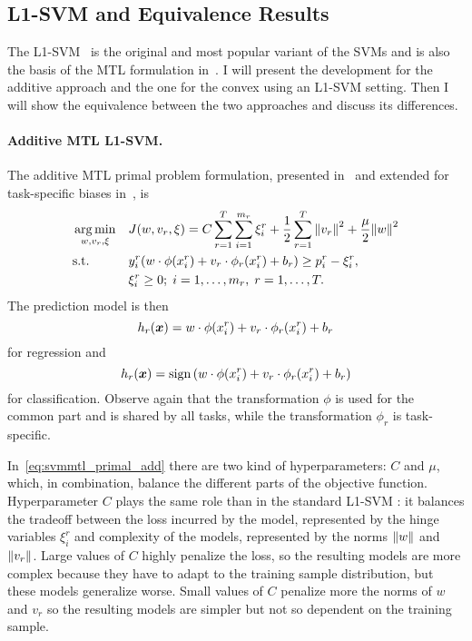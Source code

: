\subsection{L1-SVM and Equivalence Results}\label{subsec:cvx_l1-svm}
The L1-SVM~\citet{Vapnik00} is the original and most popular variant of the SVMs and is also the basis of the MTL formulation in~\cite{EvgeniouP04}.
I will present the development for the {additive} approach and the one for the {convex} using an L1-SVM setting. Then I will show the equivalence between the two approaches and discuss its differences.

\paragraph*{{Additive} MTL L1-SVM.\\}
The {additive} MTL primal problem formulation, presented in~\cite{EvgeniouP04} 
and extended for task-specific biases in~\cite{CaiC12}, is
\begin{equation}\label{eq:svmmtl_primal_add}
    \begin{aligned}
    & \argmin_{w, {v}_r, \xi}
    & & {J({w}, {v}_r, \xi) = C \sum_{r= 1}^T \sum_{i=1}^{m_r} {\xi_{i}^r} + \frac{1}{2} \sum_{r= 1}^T{\norm{{v}_r}^2} + \frac{\mu}{2} {\norm{{w}}}^2} \\
    & \text{s.t.}
    & & y_{i}^r ({w} \cdot \phi(x_{i}^r) + {v}_r \cdot \phi_r(x_{i}^r) + b_r) \geq p_{i}^r - \xi_{i}^r ,  \\
    & & & \xi_{i}^r \geq 0; \;  i=1 , \dotsc , m_r, \;  r= 1,\dotsc, T  . \\
    \end{aligned}
\end{equation}
The prediction model is then 
\begin{equation}
    \nonumber
    h_r(\bm{x}) = {w} \cdot \phi(x_{i}^r) + {v}_r \cdot \phi_r(x_{i}^r) + b_r
\end{equation}
for regression and 
\begin{equation}
    \nonumber
    h_r(\bm{x}) = \operatorname{sign}{ \left({w} \cdot \phi(x_{i}^r) + {v}_r \cdot \phi_r(x_{i}^r) + b_r \right)}
\end{equation}
for classification.
Observe again that the transformation $\phi$ is used for the common part and is shared by all tasks, while the transformation $\phi_r$ is task-specific.

%
In~\eqref{eq:svmmtl_primal_add} there are two kind of hyperparameters: $C$ and $\mu$, which, in combination, balance the different parts of the objective function. 
%
Hyperparameter $C$ plays the same role than in the standard L1-SVM : it balances the tradeoff between the loss incurred by the model, represented by the hinge variables $\xi_i^r$ and complexity of the models, represented by the norms $\left\lVert{w}\right\rVert$ and $\left\lVert{v}_r\right\rVert$. Large values of $C$ highly penalize the loss, so the resulting models are more complex because they have to adapt to the training sample distribution, but these models generalize worse. Small values of $C$ penalize more the norms of $w$ and $v_r$ so the resulting models are simpler but not so dependent on the training sample.

